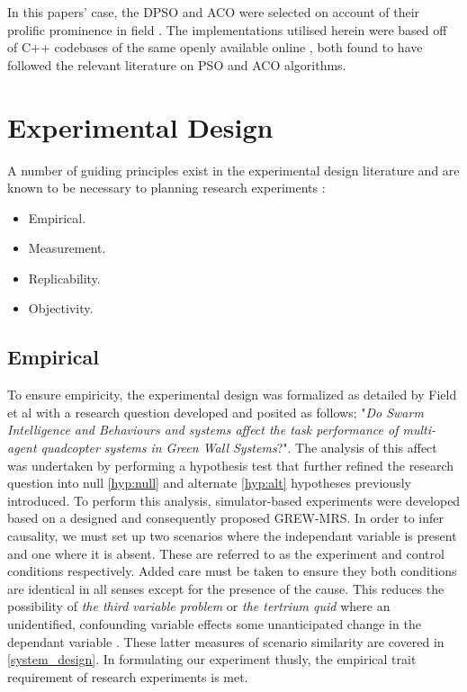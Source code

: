 \documentclass{report}
\begin{document}
In this papers' case, the DPSO and ACO were selected on account of their prolific prominence in field \cite{Selvi2010}. The implementations utilised herein were based off of C++ codebases of the same openly available online \cite{PSOTSP} \cite{ACOTSP}, both found to have followed the relevant literature on PSO \cite{Kennedy1995} and ACO \cite{Dorigo1999} algorithms.

\section{Experimental Design}
A number of guiding principles exist in the experimental design literature and are known to be necessary to planning research experiments \cite{Field2012}:
\begin{itemize}
	\item Empirical.
	\item Measurement.
	\item Replicability.
	\item Objectivity.
\end{itemize}

\subsection{Empirical}

To ensure empiricity, the experimental design was formalized as detailed by Field et al \cite{Field2012} with a research question developed and posited as follows; "\textit{Do Swarm Intelligence and Behaviours and systems affect the task performance of multi-agent quadcopter systems in Green Wall Systems}?". The analysis of this affect was undertaken by performing a hypothesis test that further refined the research question into null \ref{hyp:null} and alternate \ref{hyp:alt} hypotheses previously introduced. To perform this analysis, simulator-based experiments were developed based on a designed and consequently proposed GREW-MRS. In order to infer causality, we must set up two scenarios where the independant variable is present and one where it is absent. These are referred to as the experiment and control conditions respectively. Added care must be taken to ensure they both conditions are identical in all senses except for the presence of the cause. This reduces the possibility of \textit{the third variable problem} or \textit{the tertrium quid} where an unidentified, confounding variable effects some unanticipated change in the dependant variable \cite{Field2012}. These latter measures of scenario similarity are covered in \ref{system_design}. In formulating our experiment thusly, the empirical trait requirement of research experiments is met.
\end{document}
